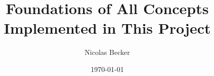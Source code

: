 \documentclass[11pt,a4paper]{article}
\begin{document}
\title{Foundations of All Concepts Implemented in This Project}
\author{Nicolas Becker}
\date{\today}

\maketitle

\tableofcontents

\newpage






% 
% 
% 

\printbibliography
\end{document}
